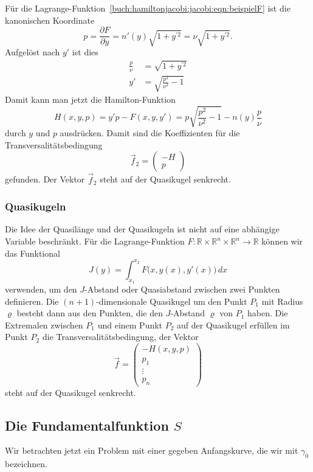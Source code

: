 \begin{beispiel}
\label{buch:hamiltonjacobi:jacobi:bsp:beispielFH}
Für die Lagrange-Funktion~\eqref{buch:hamiltonjacobi:jacobi:eqn:beispielF}
ist die kanonischen Koordinate
\[
p
=
\frac{\partial F}{\partial y}
=
n'(y)\sqrt{1+y^{\prime 2}}
=
\nu \sqrt{1+y^{\prime 2}}.
\]
Aufgelöst nach $y'$ ist dies
\begin{align*}
\frac{p}{\nu}
&=
\sqrt{1+y^{\prime 2}}
\\
y'
&=
\sqrt{ \frac{p^2}{\nu^2} -1 }
\end{align*}
Damit kann man jetzt die Hamilton-Funktion
\[
H(x,y,p)
=
y'p - F(x,y,y')
=
p\sqrt{\frac{p^2}{\nu^2}-1}
-
n(y) \frac{p}{\nu}
\]
durch $y$ und $p$ ausdrücken.
Damit sind die Koeffizienten für die Transversalitätsbedingung
\[
\vec{f}_2
=
\begin{pmatrix} 
-H\\
p
\end{pmatrix}
\]
gefunden.
Der Vektor $\vec{f}_2$ steht auf der Quasikugel senkrecht.
\end{beispiel}

%
%
\subsubsection{Quasikugeln}
Die Idee der Quasilänge und der Quasikugeln ist nicht auf eine abhängige
Variable beschränkt.
Für die Lagrange-Funktion 
$F\colon \mathbb{R}\times\mathbb{R}^n\times\mathbb{R}^n\to\mathbb{R}$
können wir das Funktional
\[
J(y) = \int_{x_1}^{x_2} F\bigl(x,y(x),y'(x)\bigr)\,dx
\]
verwenden, um den $J$-Abstand oder Quasiabstand zwischen zwei Punkten
definieren.
Die $(n+1)$-dimensionale Quasikugel um den Punkt $P_1$ mit Radius $\varrho$
besteht dann aus den Punkten, die den $J$-Abstand $\varrho$ von $P_1$ haben.
Die Extremalen zwischen $P_1$ und einem Punkt $P_2$ auf der Quasikugel
erfüllen im Punkt $P_2$ die Transversalitätsbedingung, der Vektor
\[
\vec{f}
=
\begin{pmatrix}
-H(x,y,p)\\
p_1\\
\vdots\\
p_n
\end{pmatrix}
\]
steht auf der Quasikugel senkrecht.

%
%
\subsection{Die Fundamentalfunktion $S$}
Wir betrachten jetzt ein Problem mit einer gegeben Anfangskurve,
die wir mit $\gamma_0$ bezeichnen.

